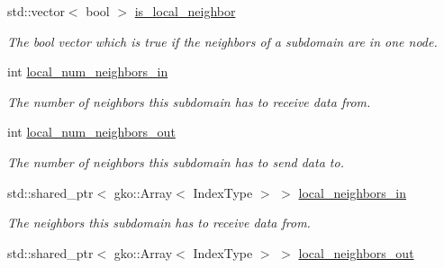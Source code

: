 \begin{DoxyCompactItemize}
std\+::vector$<$ bool $>$ \hyperlink{structschwz_1_1Communicate_1_1comm__struct_a66536e858c43c5ebbba8bd3fb4b5e888}{is\+\_\+local\+\_\+neighbor}
\begin{DoxyCompactList}\small\item\em The bool vector which is true if the neighbors of a subdomain are in one node. \end{DoxyCompactList}\item 
\mbox{\label{structschwz_1_1Communicate_1_1comm__struct_ae3c247c1209882303d447ad19e3e7357}} 
int \hyperlink{structschwz_1_1Communicate_1_1comm__struct_ae3c247c1209882303d447ad19e3e7357}{local\+\_\+num\+\_\+neighbors\+\_\+in}
\begin{DoxyCompactList}\small\item\em The number of neighbors this subdomain has to receive data from. \end{DoxyCompactList}\item 
\mbox{\label{structschwz_1_1Communicate_1_1comm__struct_a78c48f1aa2e1bf2d74851478388d262f}} 
int \hyperlink{structschwz_1_1Communicate_1_1comm__struct_a78c48f1aa2e1bf2d74851478388d262f}{local\+\_\+num\+\_\+neighbors\+\_\+out}
\begin{DoxyCompactList}\small\item\em The number of neighbors this subdomain has to send data to. \end{DoxyCompactList}\item 
\mbox{\label{structschwz_1_1Communicate_1_1comm__struct_a42105f0e1d5d3787cf49eeacba5fd2ed}} 
std\+::shared\+\_\+ptr$<$ gko\+::\+Array$<$ Index\+Type $>$ $>$ \hyperlink{structschwz_1_1Communicate_1_1comm__struct_a42105f0e1d5d3787cf49eeacba5fd2ed}{local\+\_\+neighbors\+\_\+in}
\begin{DoxyCompactList}\small\item\em The neighbors this subdomain has to receive data from. \end{DoxyCompactList}\item 
\mbox{\label{structschwz_1_1Communicate_1_1comm__struct_ad0f64a50ac0d8a56121dcdcbbd92035a}} 
std\+::shared\+\_\+ptr$<$ gko\+::\+Array$<$ Index\+Type $>$ $>$ \hyperlink{structschwz_1_1Communicate_1_1comm__struct_ad0f64a50ac0d8a56121dcdcbbd92035a}{local\+\_\+neighbors\+\_\+out}

\end{DoxyCompactItemize}
